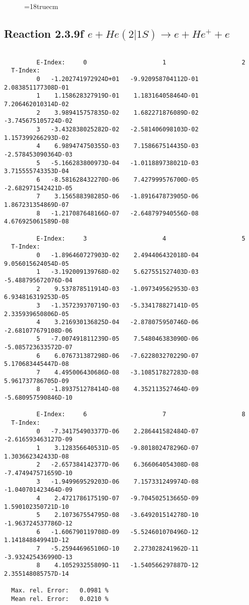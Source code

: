 \begin{figure} \label{2.3.9e}
\epsfxsize=18truecm
\end{figure}
\newpage

\subsection{
Reaction 2.3.9f  $e + He(2|1S) \rightarrow e + He^+ + e  $
}



\begin{verbatim}

         E-Index:     0                     1                     2
  T-Index:
         0   -1.202741972924D+01   -9.920958704112D-01    2.083851177308D-01
         1    1.158628327919D-01    1.183164058464D-01    7.206462010314D-02
         2    3.989415757835D-02    1.682271876089D-02   -3.745675105724D-02
         3   -3.432838025282D-02   -2.581406098103D-02    1.157399266293D-02
         4    6.989474750355D-03    7.158667514435D-03   -2.578453090364D-03
         5   -5.166283800973D-04   -1.011889738021D-03    3.715555743353D-04
         6   -8.581628432270D-06    7.427999576700D-05   -2.682971542421D-05
         7    3.156588398285D-06   -1.891647873905D-06    1.867231354869D-07
         8   -1.217087648166D-07   -2.648797940556D-08    4.676925061589D-08

         E-Index:     3                     4                     5
  T-Index:
         0   -1.896460727903D-02    2.494406432018D-04    9.056015624054D-05
         1   -3.192009139768D-02    5.627551527403D-03   -5.488795672076D-04
         2    9.537878511914D-03   -1.097349562953D-03    6.934816319253D-05
         3   -1.357239370719D-03   -5.334178827141D-05    2.335939650806D-05
         4    3.216930136825D-04   -2.878075950746D-06   -2.681077679108D-06
         5   -7.007491811239D-05    7.548046383090D-06   -5.085723633572D-07
         6    6.076731387298D-06   -7.622803270229D-07    5.170683445447D-08
         7    4.495006430686D-08   -3.108517827283D-08    5.961737786705D-09
         8   -1.893751278414D-08    4.352113527464D-09   -5.680957590846D-10

         E-Index:     6                     7                     8
  T-Index:
         0   -7.341754903377D-06    2.286441582484D-07   -2.616593463127D-09
         1    3.128356640531D-05   -9.801802478296D-07    1.303662342433D-08
         2   -2.657384142377D-06    6.366064054308D-08   -7.474947571659D-10
         3   -1.949969529203D-06    7.157331249974D-08   -1.040701423464D-09
         4    2.472178617519D-07   -9.704502513665D-09    1.590102350721D-10
         5    2.107367554795D-08   -3.649201514278D-10   -1.963724537786D-12
         6   -1.606790119708D-09   -5.524601070496D-12    1.141848849941D-12
         7   -5.259446965106D-10    2.273028241962D-11   -3.932425436990D-13
         8    4.105293255809D-11   -1.540566297887D-12    2.355148085757D-14

  Max. rel. Error:   0.0981 %
  Mean rel. Error:   0.0210 %


\end{verbatim}
